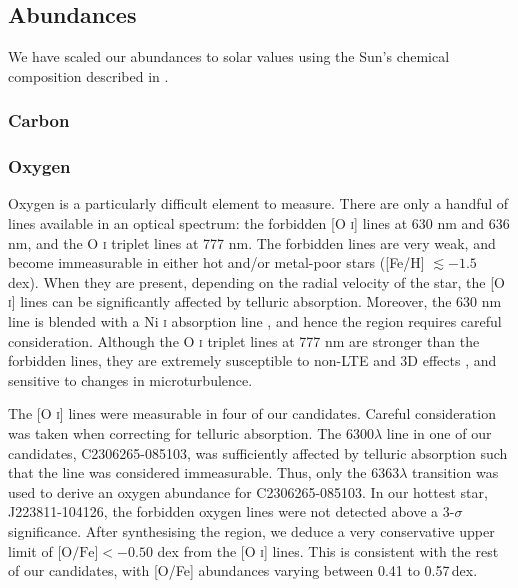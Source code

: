 \documentclass{emulateapj}
\begin{document}


\subsection{Abundances}
We have scaled our abundances to solar values using the Sun's chemical composition described in \citet{asplund;et-al_2009}.

\subsubsection{Carbon}

\subsubsection{Oxygen}
\label{sec:oxygen-abundances}
Oxygen is a particularly difficult element to measure. There are only a handful of lines available in an optical spectrum: the forbidden [O \textsc{i}] lines at 630 nm and 636 nm, and the O \textsc{i} triplet lines at 777 nm. The forbidden lines are very weak, and become immeasurable in either hot and/or metal-poor stars ([Fe/H] $\lesssim -1.5$ dex). When they are present, depending on the radial velocity of the star, the [O \textsc{i}] lines can be significantly affected by telluric absorption. Moreover, the 630 nm line is blended with a Ni \textsc{i} absorption line \citep{allende-prieto;et-al_2001}, and hence the region requires careful consideration. Although the O \textsc{i} triplet lines at 777 nm are stronger than the forbidden lines, they are extremely susceptible to non-LTE and 3D effects \citep{asplund;perez_2001}, and sensitive to changes in microturbulence. 

The [O \textsc{i}] lines were measurable in four of our candidates. Careful consideration was taken when correcting for telluric absorption. The 6300$\lambda$ line in one of our candidates, C2306265-085103, was sufficiently affected by telluric absorption such that the line was considered immeasurable. Thus, only the 6363$\lambda$ transition was used to derive an oxygen abundance for C2306265-085103. In our hottest star, J223811-104126, the forbidden oxygen lines were not detected above a 3-$\sigma$ significance. After synthesising the region, we deduce a very conservative upper limit of $\mbox{[O/Fe]} < -0.50$ dex from the [O \textsc{i}] lines. This is consistent with the rest of our candidates, with [O/Fe] abundances varying between 0.41 to 0.57\,dex.
\end{document}
